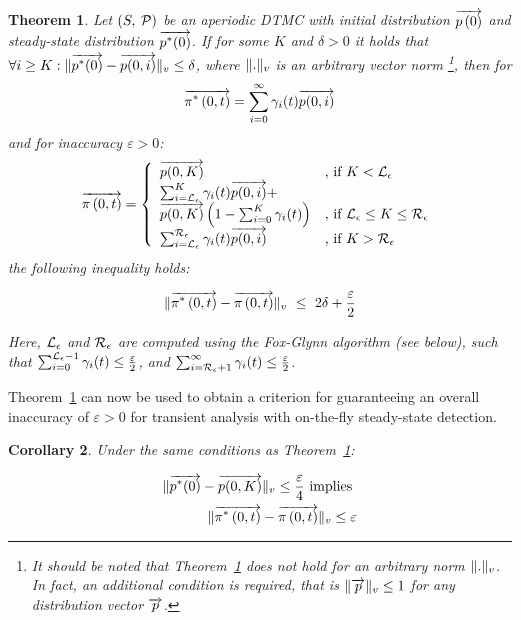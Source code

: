 \documentclass[times, 10pt,twocolumn]{article}
\newtheorem{theorem}{Theorem}
\newtheorem{corollary}[theorem]{Corollary}
\begin{document}
		\begin{theorem}
			\cite{MalhotraMT_MR94} Let $\left( S,\: \mathcal{P} \right)$ be an aperiodic DTMC with initial distribution $\overrightarrow{p \left( 0 \right)}$ and steady-state distribution $\overrightarrow{p^{*}(0)}$. If for some $K$ and $\delta > 0$ it holds that $\forall i \geq K : \lVert \overrightarrow{p^{*}(0)} - \overrightarrow{p(0,i)} \rVert_{v} \leq \delta$, where $\lVert . \rVert_{v}$ is an arbitrary vector norm \footnote{It should be noted that Theorem~\ref{th:error_fwd_initial} does not hold for an arbitrary norm $\lVert . \rVert_{v}$. In fact, an additional  condition is required, that is $\lVert \overrightarrow{p} \rVert_{v}\leq 1$ for any distribution vector $\overrightarrow{p}$.}, then for
			{\small
			\[
				\overrightarrow{\pi^{*} \left(0, t \right )} = \sum_{i=0}^{\infty}\gamma_{i}(t) \overrightarrow{p(0,i)}
			\]
			}
			and for inaccuracy $\varepsilon > 0$:
			{\small
			\begin{equation}
				\displaystyle
				\overrightarrow{\pi \left(0, t \right )} = \left\{
				\begin{array}{ll}
					\overrightarrow{p(0,K)} & \text{, if } K < \mathcal{L}_{\epsilon}\\
					\sum_{i=\mathcal{L}_{\epsilon}}^{K}\gamma_{i}(t) \overrightarrow{p(0,i)} + & \\
					\overrightarrow{p(0,K)} \left(1- \sum_{i=0}^{K}\gamma_{i}(t) \right) & \text{, if } \mathcal{L}_{\epsilon} \leq K \leq \mathcal{R}_{\epsilon}\\
					\sum_{i=\mathcal{L}_{\epsilon}}^{\mathcal{R}_{\epsilon}}\gamma_{i}(t) \overrightarrow{p(0,i)} & \text{, if } K > \mathcal{R}_{\epsilon}\\
				\end{array}
				\right .
				\label{eq:ssd_LR_initial}
			\end{equation}
			}
			the following inequality holds:
			{\small
			\begin{fframe}{0.6}{-0.3}
				\[
					\lVert \overrightarrow{\pi^{*} \left(0, t \right )} - \overrightarrow{\pi \left(0, t \right )} \rVert_{v} \ \leq \ 2 \delta + \frac{\varepsilon}{2}
				\]
			\end{fframe}
			}
			Here, $\mathcal{L}_{\epsilon}$ and $\mathcal{R}_{\epsilon}$ are computed using the Fox-Glynn algorithm (see below), such that $\sum_{i=0}^{\mathcal{L}_{\epsilon}-1} \gamma_{i}(t) \leq \frac{\varepsilon}{2}$, and $\sum_{i=\mathcal{R}_{\epsilon}+1}^{\infty} \gamma_{i}(t) \leq \frac{\varepsilon}{2}$.
			\label{th:error_fwd_initial}
		\end{theorem}
		
		Theorem~\ref{th:error_fwd_initial} can now be used to obtain a criterion for guaranteeing an overall inaccuracy of $\varepsilon > 0$ for transient analysis with on-the-fly steady-state detection.
		
		\begin{corollary}
			Under the same conditions as Theorem~\ref{th:error_fwd_initial}: 
			{\small
				\begin{fframe}{0.68}{-0.3}
					\begin{eqnarray}
						\lVert \overrightarrow{p^{*}(0)} - \overrightarrow{p(0,K)} \rVert_{v} \leq \frac{\varepsilon}{4} \nonumber \text{ implies } \\
						\lVert \overrightarrow{\pi^{*} \left(0, t \right )} - \overrightarrow{\pi \left(0, t \right )} \rVert_{v} \leq \varepsilon
						\label{eq:malh_cr_cor}
					\end{eqnarray}
				\end{fframe}
			}
			\label{cl:error_fwd_initial}
 		\end{corollary}
\end{document}
